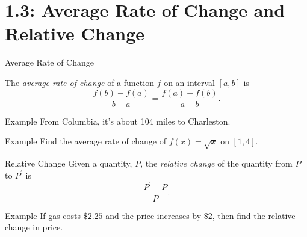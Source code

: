 \documentclass[Lecture.tex]{subfiles}
\begin{document}
\section{1.3: Average Rate of Change and Relative Change}

\begin{frame}{Average Rate of Change}
  \begin{defn}
    The {\it average rate of change} of a function $f$ on an interval $[a,b]$ is
    $$\frac{f(b) - f(a)}{b - a} = \frac{f(a) - f(b)}{a - b}.$$
  \end{defn}
\end{frame}

\begin{frame}{Example}
  From Columbia, it's about 104 miles to Charleston.
  \\

  
\end{frame}

\begin{frame}{Example}
  Find the average rate of change of $f(x) = \sqrt{x}$ on $[1,4]$.

\end{frame}

\begin{frame}{Relative Change}
  Given a quantity, $P$, the {\it relative change} of the quantity from $P$ to $P^\prime$ is
  $$\frac{P^\prime - P}{P}.$$
\end{frame}

\begin{frame}{Example}
  If gas costs $\$2.25$ and the price increases by $\$2$, then find the relative change in price.
\end{frame}
\end{document}
